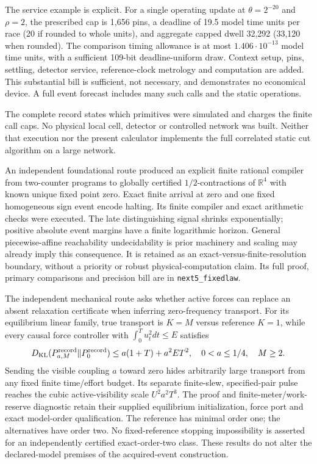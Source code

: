 The service example is explicit. For a single operating update at
$\theta=2^{-20}$ and $\rho=2$, the prescribed cap is 1,656 pins, a
deadline of 19.5 model time units per race (20 if rounded to whole
units), and aggregate capped dwell 32,292 (33,120 when rounded).
The comparison timing allowance is at most
$1.406\cdot10^{-13}$ model time units, with a sufficient 109-bit
deadline-uniform draw. Context setup, pins, settling, detector service,
reference-clock metrology and computation are added. This substantial
bill is sufficient, not necessary, and demonstrates no economical
device. A full event forecast includes many such calls and the static
operations.

The complete record states which primitives were simulated and charges
the finite call caps. No physical
local cell, detector or controlled network was built. Neither that
execution nor the present calculator implements the full correlated
static cut algorithm on a large network.

An independent foundational route produced an explicit finite rational
compiler from two-counter programs to globally certified
$1/2$-contractions of $\mathbb R^4$ with known unique fixed point zero.
Exact finite arrival at zero and one fixed homogeneous sign event encode
halting. Its finite compiler and exact arithmetic checks were executed.
The late distinguishing signal shrinks exponentially; positive absolute
event margins have a finite logarithmic horizon. General piecewise-affine
reachability undecidability is prior machinery and scaling may already
imply this consequence. It is retained as an exact-versus-finite-resolution
boundary, without a priority or robust physical-computation claim. Its
full proof, primary comparisons and precision bill are in
\texttt{next5\_fixedlaw}.

The independent mechanical route asks whether active forces can replace
an absent relaxation certificate when inferring zero-frequency transport.
For its equilibrium linear family, true transport is $K=M$ versus
reference $K=1$, while every causal force controller with
$\int_0^T u_t^2dt\le E$ satisfies
\[
D_{\rm KL}(P_{a,M}^{\rm record}\Vert P_0^{\rm record})
\le a(1+T)+a^2ET^2,
\quad 0<a\le1/4,\quad M\ge2.
\]
Sending the visible coupling $a$ toward zero hides arbitrarily large
transport from any fixed finite time/effort budget. Its separate
finite-slew, specified-pair pulse reaches the cubic active-visibility
scale $U^2a^2T^3$. The proof and finite-meter/work-reserve diagnostic
retain their supplied equilibrium initialization, force port and exact
model-order qualification. The reference has minimal order one;
the alternatives have order two. No fixed-reference stopping
impossibility is asserted for an independently certified exact-order-two
class. These results do not alter the declared-model premises of the
acquired-event construction.

